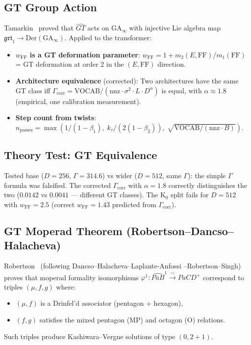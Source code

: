 \documentclass[11pt]{amsart}
\begin{document}
\subsection{GT Group Action}

Tamarkin~\cite{tamarkin0202039} proved that $\widehat{GT}$ acts on
$\mathrm{GA}_\infty$ with injective Lie algebra map
$\mathfrak{grt}_1 \to \mathrm{Der}(\mathrm{GA}_\infty)$.
Applied to the transformer:

\begin{itemize}
\item \textbf{$w_\mathrm{FF}$ is a GT deformation parameter}:
  $w_\mathrm{FF} = 1 + m_2(E,\mathrm{FF})/m_1(\mathrm{FF})$
  = GT deformation at order 2 in the $(E,\mathrm{FF})$ direction.
\item \textbf{Architecture equivalence} (corrected):
  Two architectures have the same GT class iff
  $\Gamma_\mathrm{corr} = \mathrm{VOCAB}/(\mathrm{nnz}\cdot\sigma^2\cdot L\cdot D^\alpha)$
  is equal, with $\alpha\approx 1.8$ (empirical, one calibration measurement).
\item \textbf{Step count from twists}:
  $n_\mathrm{passes} = \max(1/(1-\beta_1),\; k_\tau/(2(1-\beta_2)),\;
  \sqrt{\mathrm{VOCAB}/(\mathrm{nnz}\cdot B)})$.
\end{itemize}

\subsection{Theory Test: GT Equivalence}

Tested base ($D=256$, $\Gamma=314.6$) vs wider ($D=512$, same $\Gamma$):
the simple $\Gamma$ formula was falsified.
The corrected $\Gamma_\mathrm{corr}$ with $\alpha=1.8$ correctly
distinguishes the two ($0.0142$ vs $0.0041$ --- different GT classes).
The K$_0$ split fails for $D=512$ with $w_\mathrm{FF}=2.5$
(correct $w_\mathrm{FF}=1.43$ predicted from $\Gamma_\mathrm{corr}$).

\subsection{GT Moperad Theorem (Robertson--Dancso--Halacheva)}
\label{subsec:gtm}

Robertson~\cite{robertson2024} (following Dancso--Halacheva--Laplante-Anfossi
--Robertson--Singh) proves that moperad formality isomorphisms
$\varphi^1\colon \widehat{PaB}^1 \xrightarrow{\;\sim\;} PaCD^+$
correspond to triples $(\mu, f, g)$ where:
\begin{itemize}
  \item $(\mu, f)$ is a Drinfel'd associator (pentagon + hexagon),
  \item $(f, g)$ satisfies the mixed pentagon (MP) and octagon (O) relations.
\end{itemize}
Such triples produce Kashiwara--Vergne solutions of type $(0, 2{+}1)$.
\end{document}
